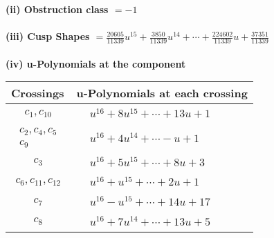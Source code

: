 \documentclass[1p]{elsarticle_modified}
\theoremstyle{definition}
\begin{document}
\flushleft \textbf{(ii) Obstruction class $= -1$}\\~\\
\flushleft \textbf{(iii) Cusp Shapes $= \frac{20605}{11339} u^{15}+\frac{3850}{11339} u^{14}+\cdots+\frac{224602}{11339} u+\frac{37351}{11339}$}\\~\\
\newpage\renewcommand{\arraystretch}{1}
\flushleft \textbf{(iv) u-Polynomials at the component}\newline \\
\begin{tabular}{m{50pt}|m{274pt}}
Crossings & \hspace{64pt}u-Polynomials at each crossing \\
\hline $$\begin{aligned}c_{1},c_{10}\end{aligned}$$&$\begin{aligned}
&u^{16}+8 u^{15}+\cdots+13 u+1
\end{aligned}$\\
\hline $$\begin{aligned}c_{2},c_{4},c_{5}\\c_{9}\end{aligned}$$&$\begin{aligned}
&u^{16}+4 u^{14}+\cdots- u+1
\end{aligned}$\\
\hline $$\begin{aligned}c_{3}\end{aligned}$$&$\begin{aligned}
&u^{16}+5 u^{15}+\cdots+8 u+3
\end{aligned}$\\
\hline $$\begin{aligned}c_{6},c_{11},c_{12}\end{aligned}$$&$\begin{aligned}
&u^{16}+u^{15}+\cdots+2 u+1
\end{aligned}$\\
\hline $$\begin{aligned}c_{7}\end{aligned}$$&$\begin{aligned}
&u^{16}- u^{15}+\cdots+14 u+17
\end{aligned}$\\
\hline $$\begin{aligned}c_{8}\end{aligned}$$&$\begin{aligned}
&u^{16}+7 u^{14}+\cdots+13 u+5
\end{aligned}$\\
\hline
\end{tabular}\\~\\
\end{document}
